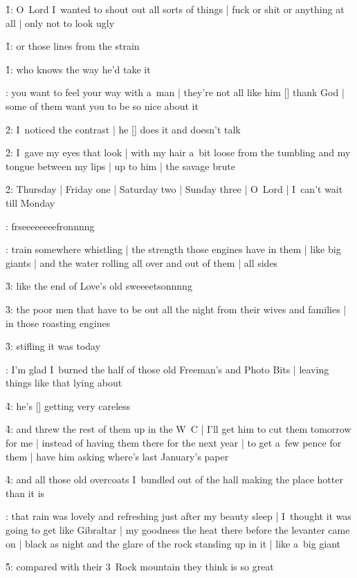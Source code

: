 \f1:
O~Lord I~wanted to shout out all sorts of things |
fuck or shit or anything at all |
only not to look ugly

\f1:
or those lines from the strain

\f1:
who knows the way he'd take it

:
you want to feel your way with a~man |
they're not all like him [\bloom] thank God |
some of them want you to be so nice about it

\f2:
I~noticed the contrast |
he [\boylan] does it and doesn't talk

\f2:
I~gave my eyes that look |
with my hair a~bit loose from the tumbling and my tongue between my lips |
up to him |
the savage brute

\f2:
Thursday |
Friday one |
Saturday two |
Sunday three |
O~Lord |
I~can't wait till Monday




:
frseeeeeeeefronnnng

:
train somewhere whistling |
the strength those engines have in them |
like big giants |
and the water rolling all over and out of them |
all sides

\f3:
like the end of Love's old sweeeetsonnnng

\f3:
the poor men that have to be out all the night from their wives and families |
in those roasting engines

\f3:
stifling it was today

:
I'm glad I~burned the half of those old Freeman's and Photo Bits |
leaving things like that lying about

\f4:
he's [\bloom] getting very careless

\f4:
and threw the rest of them up in the W~C |
I'll get him to cut them tomorrow for me |
instead of having them there for the next year |
to get a~few pence for them |
have him asking where's last January's paper

\f4:
and all those old overcoats I~bundled out of the hall making the place hotter than it is

:
that rain was lovely and refreshing just after my beauty sleep |
I~thought it was going to get like Gibraltar |
my goodness the heat there before the levanter came on |
black as night and the glare of the rock standing up in it |
like a~big giant

\f5:
compared with their 3~Rock mountain they think is so great

